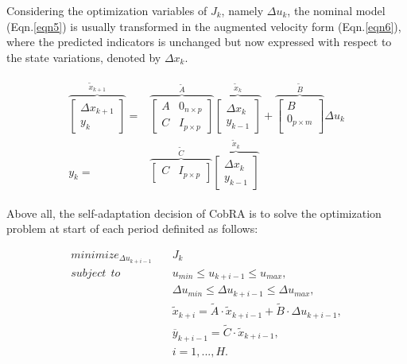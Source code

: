 \documentclass[sigconf]{acmart}
\begin{document}
	Considering the optimization variables of \emph{$J_k$}, namely {$\Delta u_k$}, the nominal model (Eqn.\ref{eqn5}) is usually transformed in the augmented velocity form (Eqn.\ref{eqn6}), where the predicted indicators is unchanged but now expressed with respect to the state variations, denoted by \emph{$\Delta x_k$}.
	
	
	\begin{equation}
	\begin{aligned}
	\begin{split}
	\overbrace{
		\begin{bmatrix}
		\Delta x_{k\!+\!1} \\
		y_k
		\end{bmatrix}
	}^{\widetilde{x}_{k\!+\!1}}
	=&
	\overbrace{
		\begin{bmatrix}
		A & 0_{n\times p}\\
		C & I_{p\times p}
		\end{bmatrix}
	}^{\widetilde{A}}
	\overbrace{
		\begin{bmatrix}
		\Delta x_k \\
		y_{k\!-\!1}
		\end{bmatrix}
	}^{\widetilde{x}_k}
	+
	\overbrace{
		\begin{bmatrix}
		B\\
		0_{p\times m}\\
		\end{bmatrix}
	}^{\widetilde{B}}
	\Delta u_k \\
	y_k=&\overbrace{
		\begin{bmatrix}
		C & I_{p\times p}
		\end{bmatrix}
	}^{\widetilde{C}}
	\overbrace{
		\begin{bmatrix}
		\Delta x_k\\
		y_{k\!-\!1}
		\end{bmatrix}
	}^{\widetilde{x}_k}
	\end{split}
	\end{aligned}
	\label{eqn6}
	\end{equation}
	
	
	
	Above all, the self-adaptation decision of CobRA is to solve the optimization problem at start of each period definited as follows:
	
	\begin{equation}
	\begin{aligned}
	minimize_{\Delta u_{k+i-1}}&\quad J_k \\
	subject ~\ to& \quad u_{min}\leq u_{k+i-1}\leq u_{max},\\
	& \quad {\Delta u_{min}}\leq{ \Delta u_{k+i-1}}\leq {\Delta u_{max}},\\
	& \quad \tilde{x}_{k+i}=\tilde{A}\cdot \tilde{x}_{k+i-1}+\tilde{B}\cdot \Delta u_{k+i-1}, \\
	& \quad \overline{y}_{k+i-1}=\tilde{C}\cdot \tilde{x}_{k+i-1}, \\
	& \quad i=1,...,H.\\
	\end{aligned}
	\end{equation}
	
\end{document}
